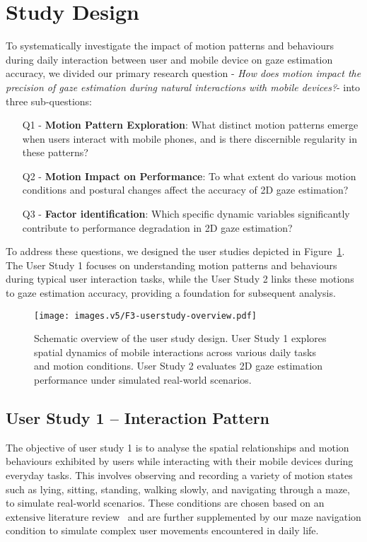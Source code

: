 \section{Study Design}\label{sec:studydesign}
To systematically investigate the impact of motion patterns and behaviours during daily interaction between user and mobile device on gaze estimation accuracy, we divided our primary research question - \textit{How does motion impact the precision of gaze estimation during natural interactions with mobile devices?}- into three sub-questions:

\begin{itemize}
    \item[Q1] - \textbf{Motion Pattern Exploration}: What distinct motion patterns emerge when users interact with mobile phones, and is there discernible regularity in these patterns?
    \item[Q2] - \textbf{Motion Impact on Performance}: To what extent do various motion conditions and postural changes affect the accuracy of 2D gaze estimation?
    \item[Q3] - \textbf{Factor identification}: Which specific dynamic variables significantly contribute to performance degradation in 2D gaze estimation?
\end{itemize}

To address these questions, we designed the user studies depicted in Figure~\ref{fig:study-outline}. The User Study 1 focuses on understanding motion patterns and behaviours during typical user interaction tasks, while the User Study 2 links these motions to gaze estimation accuracy, providing a foundation for subsequent analysis.

\begin{figure}[!htbp]
    \centering
    \texttt{[image: images.v5/F3-userstudy-overview.pdf]}
    \caption{Schematic overview of the user study design. User Study 1 explores spatial dynamics of mobile interactions across various daily tasks and motion conditions. User Study 2 evaluates 2D gaze estimation performance under simulated real-world scenarios.}
    \label{fig:study-outline}
\end{figure}

\subsection{User Study 1 -- Interaction Pattern}
The objective of user study 1 is to analyse the spatial relationships and motion behaviours exhibited by users while interacting with their mobile devices during everyday tasks.  This involves observing and recording a variety of motion states such as lying, sitting, standing, walking slowly, and navigating through a maze, to simulate real-world scenarios. These conditions are chosen based on an extensive literature review~\cite{huang2017screenglint,arakawa2022rgbdgaze, zhang2015appearance,huang2017tabletgaze, funes2014eyediap, lei2023DynamicRead, team2024screentime} and are further supplemented by our maze navigation condition to simulate complex user movements encountered in daily life. 

